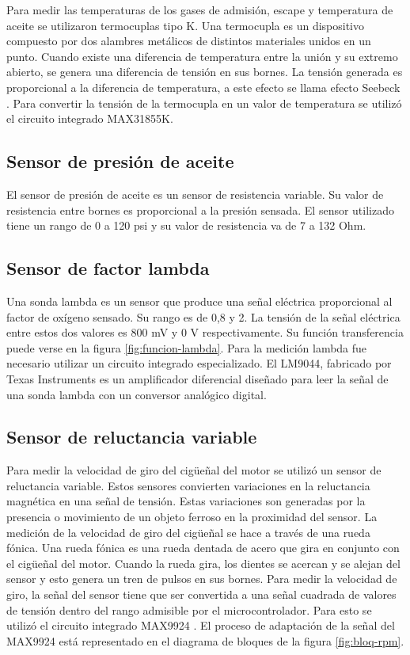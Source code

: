Para medir las temperaturas de los gases de admisión, escape y temperatura de aceite se utilizaron termocuplas tipo K. Una termocupla es un dispositivo compuesto por dos alambres metálicos de distintos materiales unidos en un punto. Cuando existe una diferencia de temperatura entre la unión y su extremo abierto, se genera una diferencia de tensión en sus bornes. La tensión generada es proporcional a la diferencia de temperatura, a este efecto se llama efecto Seebeck \cite{termocupla}. Para convertir la tensión de la termocupla en un valor de temperatura se utilizó el circuito integrado MAX31855K.

\subsection{Sensor de presión de aceite}

El sensor de presión de aceite es un sensor de resistencia variable. Su valor de resistencia entre bornes es proporcional a la presión sensada. El sensor utilizado tiene un rango de 0 a 120 psi y su valor de resistencia va de 7 a 132 Ohm.

\subsection{Sensor de factor lambda}

Una sonda lambda es un sensor que produce una señal eléctrica proporcional al factor de oxígeno sensado. Su rango es de 0,8 y 2. La tensión de la señal eléctrica entre estos dos valores es 800 mV y 0 V respectivamente. Su función transferencia puede verse en la figura \ref{fig:funcion-lambda}. Para la medición lambda fue necesario utilizar un circuito integrado especializado. El LM9044, fabricado por Texas Instruments es un amplificador diferencial diseñado para leer la señal de una sonda lambda con un conversor analógico digital.

\subsection{Sensor de reluctancia variable}

Para medir la velocidad de giro del cigüeñal del motor se utilizó un sensor de reluctancia variable. Estos sensores convierten variaciones en la reluctancia magnética en una señal de tensión. Estas variaciones son generadas por la presencia o movimiento de un objeto ferroso en la proximidad del sensor. La medición de la velocidad de giro del cigüeñal se hace a través de una rueda fónica. Una rueda fónica es una rueda dentada de acero que gira en conjunto con el cigüeñal del motor. Cuando la rueda gira, los dientes se acercan y se alejan del sensor y esto genera un tren de pulsos en sus bornes. Para medir la velocidad de giro, la señal del sensor tiene que ser convertida a una señal cuadrada de valores de tensión dentro del rango admisible por el microcontrolador. Para esto se utilizó el circuito integrado MAX9924 \cite{MAX9924}. El proceso de adaptación de la señal del MAX9924 está representado en el diagrama de bloques de la figura \ref{fig:bloq-rpm}.

